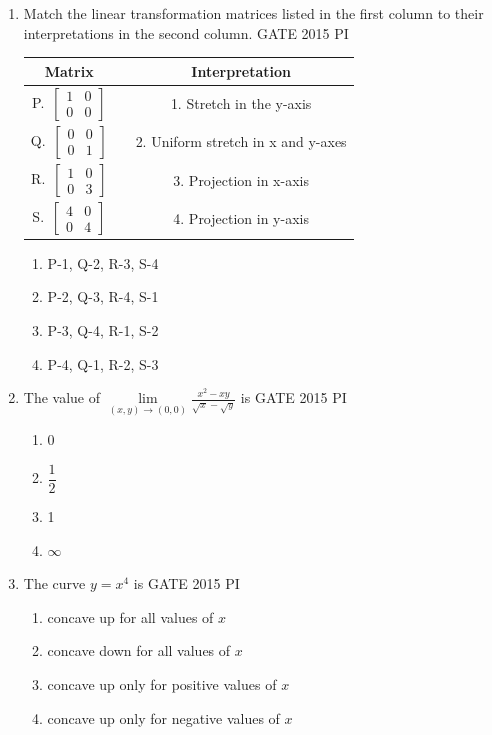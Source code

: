\documentclass[journal,12pt,onecolumn]{IEEEtran}
\theoremstyle{remark}
\begin{document}
\begin{enumerate}
\item Match the linear transformation matrices listed in the first column to their interpretations in the second column. \hfill{GATE 2015 PI}

\begin{tabular}{|c|c|c|}
\hline
\textbf{Matrix} & & \textbf{Interpretation} \\
\hline
P.\ $\begin{bmatrix} 1 & 0 \\ 0 & 0 \end{bmatrix}$ &  & 1. Stretch in the y-axis \\
Q.\ $\begin{bmatrix} 0 & 0 \\ 0 & 1 \end{bmatrix}$ &  & 2. Uniform stretch in x and y-axes \\
R.\ $\begin{bmatrix} 1 & 0 \\ 0 & 3 \end{bmatrix}$ &  & 3. Projection in x-axis \\
S.\ $\begin{bmatrix} 4 & 0 \\ 0 & 4 \end{bmatrix}$ &  & 4. Projection in y-axis \\
\hline
\end{tabular}

\begin{enumerate}
    \item P-1, Q-2, R-3, S-4
    \item P-2, Q-3, R-4, S-1
    \item P-3, Q-4, R-1, S-2
    \item P-4, Q-1, R-2, S-3
\end{enumerate}

\item The value of $\lim\limits_{(x, y) \to (0, 0)} \frac{x^2 - xy}{\sqrt{x} - \sqrt{y}}$ is \hfill{GATE 2015 PI}
\begin{enumerate}
    \item 0
    \item $\dfrac{1}{2}$
    \item 1
    \item $\infty$
\end{enumerate}

\item The curve $y = x^4$ is \hfill{GATE 2015 PI}
\begin{enumerate}
    \item concave up for all values of $x$
    \item concave down for all values of $x$
    \item concave up only for positive values of $x$
    \item concave up only for negative values of $x$
\end{enumerate}


\end{enumerate}
\end{document}
